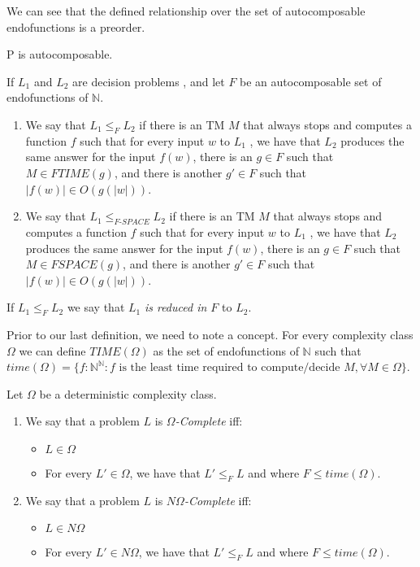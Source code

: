 We can see that the defined relationship over the set of autocomposable endofunctions is a preorder.
\begin{proposition}
P is autocomposable.
\end{proposition}


\begin{definition}
  If $L_1$ and $L_2$ are decision problems , and let $F$ be an autocomposable set of endofunctions of $\mathbb{N}$.
\begin{enumerate}
\item We say that $L_1 \le_{F} L_2$ if there is an TM $M$ that always stops and computes a function $f$ such that for every input $w$ to $L_1$ , we have that $L_2$ produces the same answer for the input $f (w )$, there is an $g\in F$ such that $M \in FTIME(g)$, and there is another $g'\in F$ such that $|f(w)| \in O(g(|w|))$.
  \item We say that $L_1 \le_{F\text{-}SPACE} L_2$ if there is an TM $M$ that always stops and computes a function $f$ such that for every input $w$ to $L_1$ , we have that $L_2$ produces the same answer for the input $f (w )$, there is an $g\in F$ such that $M \in FSPACE(g)$, and there is another $g'\in F$ such that $|f(w)| \in O(g(|w|))$.
  \end{enumerate}
If $L_1 \le_{F} L_2$ we say that $L_1$ \emph{is reduced in $F$} to $L_2$.
\end{definition}



 Prior to our last definition, we need to note a concept. For every complexity class $\Omega$ we can define $TIME(\Omega)$ as the set of endofunctions of $\mathbb{N}$ such that $time(\Omega) = \{f:\mathbb{N}^\mathbb{N} : f \text{ is the least time required to compute/decide } M, \forall M \in \Omega\}$.

\begin{definition}
  Let $\Omega$ be a deterministic complexity class.
\begin{enumerate}
\item  We say that a problem $L$ is $\Omega$\emph{-Complete} iff:
  \begin{itemize}
  \item $L \in\Omega$
  \item For every $L' \in \Omega$, we have that $L' \le_F L$ and where $F \le time(\Omega)$.
  \end{itemize}
\item We say that a problem $L$ is $N\Omega$\emph{-Complete} iff:
  \begin{itemize}
  \item $L \in N\Omega$
  \item For every $L' \in N\Omega$, we have that $L' \le_F L$ and where $F \le time(\Omega)$.
  \end{itemize}
\end{enumerate}


\end{definition}

